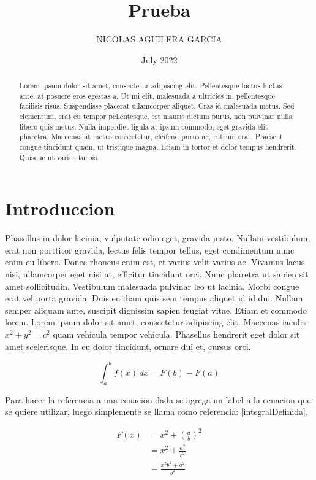 \documentclass{article}
\title{Prueba}
\author{NICOLAS AGUILERA GARCIA}
\date{July 2022}
\begin{document}
    \maketitle
    
    \begin{abstract}
        Lorem ipsum dolor sit amet, consectetur adipiscing elit. Pellentesque luctus luctus ante, at posuere eros egestas a. Ut mi elit, malesuada a ultricies in, pellentesque facilisis risus. Suspendisse placerat ullamcorper aliquet. Cras id malesuada metus. Sed elementum, erat eu tempor pellentesque, est mauris dictum purus, non pulvinar nulla libero quis metus. Nulla imperdiet ligula at ipsum commodo, eget gravida elit pharetra. Maecenas at metus consectetur, eleifend purus ac, rutrum erat. Praesent congue tincidunt quam, ut tristique magna. Etiam in tortor et dolor tempus hendrerit. Quisque ut varius turpis. 
    \end{abstract}
    
    \section{Introduccion}
        Phasellus in dolor lacinia, vulputate odio eget, gravida justo. Nullam vestibulum, erat non porttitor gravida, lectus felis tempor tellus, eget condimentum nunc enim eu libero. Donec rhoncus enim est, et varius velit varius ac. Vivamus lacus nisi, ullamcorper eget nisi at, efficitur tincidunt orci. Nunc pharetra ut sapien sit amet sollicitudin. Vestibulum malesuada pulvinar leo ut lacinia. Morbi congue erat vel porta gravida. Duis eu diam quis sem tempus aliquet id id dui. Nullam semper aliquam ante, suscipit dignissim sapien feugiat vitae. Etiam et commodo lorem. Lorem ipsum dolor sit amet, consectetur adipiscing elit. Maecenas iaculis $ x^2 + y^2 = c^2 $ quam vehicula tempor vehicula. Phasellus hendrerit eget dolor sit amet scelerisque. In eu dolor tincidunt, ornare dui et, cursus orci.
        
        \begin{equation}
            \label{integralDefinida}
            \int_{a}^{b} \! f(x)  \,dx = F(b) - F(a)
        \end{equation}
        
        Para hacer la referencia a una ecuacion dada se agrega un label a la ecuacion que se quiere utilizar, luego simplemente se llama como referencia: \eqref{integralDefinida}.
        
        \begin{equation}
            \begin{split}
                F(x) & = x^2 + \left(\frac{a}{b}\right)^2 \\
                     & = x^2 + \frac{a^2}{b^2} \\
                     & = \frac{x^2 b^2 + a^2}{b^2}
            \end{split}
        \end{equation}
        
\end{document}
